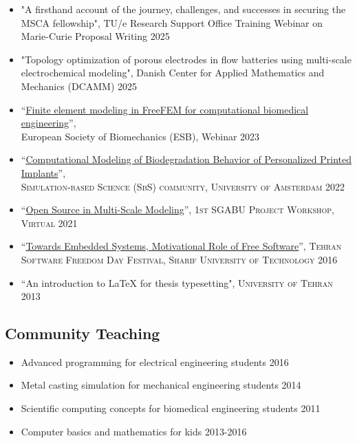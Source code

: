 \documentclass{cv}
\begin{document}
\begin{itemize}[itemsep=-0.2ex]
\item "A firsthand account of the journey, challenges, and successes in securing the MSCA fellowship", 
TU/e Research Support Office Training Webinar on Marie-Curie Proposal Writing \hfill 2025

\item "Topology optimization of porous electrodes in flow batteries using multi-scale electrochemical modeling", Danish Center for Applied Mathematics and Mechanics (DCAMM) \hfill  2025
\item
``\href{https://www.youtube.com/watch?v=hCjS38lDocg}{Finite element modeling in FreeFEM for computational biomedical engineering}'',\\ European Society of Biomechanics (ESB), Webinar \hfill 2023
\item
``\href{https://www.youtube.com/watch?v=19iz0VEIvWU}{Computational Modeling of Biodegradation Behavior of Personalized Printed Implants}'',\\ \textsc{Simulation-based Science (SbS) community, University of Amsterdam} \hfill 2022
\item
``\href{https://www.youtube.com/watch?v=3nIExqK49n4}{Open Source in Multi-Scale Modeling}'', \textsc{1st SGABU Project Workshop, Virtual} \hfill 2021
\item
``\href{https://www.slideshare.net/tehsfd/embedded-system-70659214}{Towards Embedded Systems, Motivational Role of Free Software}'', \textsc{Tehran Software Freedom Day Festival, Sharif University of Technology} \hfill 2016
\item
``An introduction to \LaTeX{} for thesis typesetting", \textsc{University of Tehran} \hfill 2013
\end{itemize}


\subsection{Community Teaching}

\begin{itemize}[itemsep=-0.2ex]
\item
Advanced programming for electrical engineering students \hfill 2016
\item
Metal casting simulation for mechanical engineering students \hfill 2014
\item
Scientific computing concepts for biomedical engineering students \hfill 2011
\item
Computer basics and mathematics for kids \hfill 2013-2016
\end{itemize}
\end{document}
